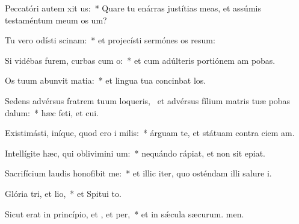 \item Peccatóri autem xit us:~* Quare tu enárras justítias meas, et assúmis testaméntum meum  os um?
\item Tu vero odísti scinam:~* et projecísti sermónes os resum:
\item Si vidébas furem, curbas cum o:~* et cum adúlteris portiónem am pobas.
\item Os tuum abunvit matia:~* et lingua tua concinbat los.
\item Sedens advérsus fratrem tuum loqueris,~\pscross{} et advérsus fílium matris tuæ pobas dalum:~* hæc feti, et cui.
\item Existimásti, iníque, quod ero i milis:~* árguam te, et státuam contra ciem am.
\item Intellígite hæc, qui oblivimini um:~* nequándo rápiat, et non sit  epiat.
\item Sacrifícium laudis honofibit me:~* et illic iter, quo osténdam illi salure i.
\item Glória tri, et lio,~* et Spitui to.
\item Sicut erat in princípio, et , et per,~* et in sǽcula sæcurum. men.
